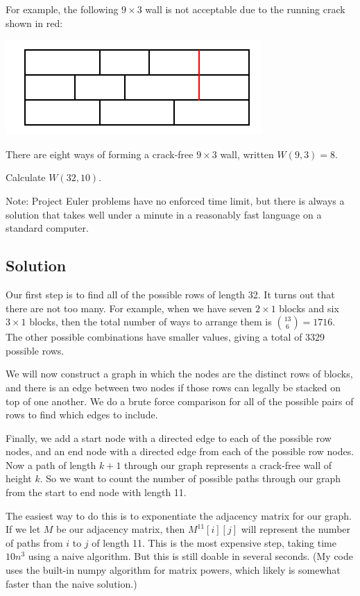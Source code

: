 \normalfont\documentclass[letterpaper,11pt]{article}
\begin{document}
For example, the following $9 \times 3$ wall is not acceptable due to the running crack shown in red:

\includegraphics{PE215_fig.png}

There are eight ways of forming a crack-free $9 \times 3$ wall, written $W(9,3) = 8$.

Calculate $W(32,10)$.

Note: Project Euler problems have no enforced time limit, but there is always a solution that takes well under a minute in a reasonably fast language on a standard computer.

\subsection*{Solution}
Our first step is to find all of the possible rows of length 32. It turns out that there are not too many. For example, when we have seven $2 \times 1$ blocks and six $3 \times 1$ blocks, then the total number of ways to arrange them is $\binom{13}{6} = 1716$. The other possible combinations have smaller values, giving a total of 3329 possible rows.

We will now construct a graph in which the nodes are the distinct rows of blocks, and there is an edge between two nodes if those rows can legally be stacked on top of one another. We do a brute force comparison for all of the possible pairs of rows to find which edges to include.

Finally, we add a start node with a directed edge to each of the possible row nodes, and an end node with a directed edge from each of the possible row nodes. Now a path of length $k + 1$ through our graph represents a crack-free wall of height $k$. So we want to count the number of possible paths through our graph from the start to end node with length 11.

The easiest way to do this is to exponentiate the adjacency matrix for our graph. If we let $M$ be our adjacency matrix, then $M^{11}[i][j]$ will represent the number of paths from $i$ to $j$ of length 11. This is the most expensive step, taking time $10n^3$ using a naive algorithm. But this is still doable in several seconds. (My code uses the built-in numpy algorithm for matrix powers, which likely is somewhat faster than the naive solution.)
\end{document}
